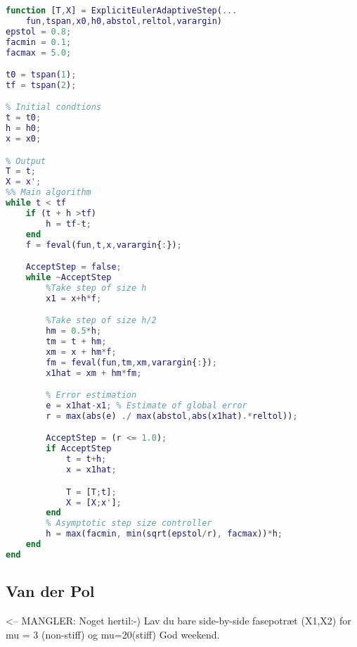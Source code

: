 \begin{adjustwidth*}{0cm}{-0.4cm}
\begin{lstlisting}[language=Matlab,caption=Explicit Euler (adaptive step size), label=ExplicitEulerFixie]
function [T,X] = ExplicitEulerAdaptiveStep(...
    fun,tspan,x0,h0,abstol,reltol,varargin)
epstol = 0.8;
facmin = 0.1;
facmax = 5.0;

t0 = tspan(1);
tf = tspan(2);

% Initial condtions
t = t0;
h = h0;
x = x0;

% Output
T = t;
X = x';
%% Main algorithm
while t < tf
    if (t + h >tf)
        h = tf-t;
    end
    f = feval(fun,t,x,varargin{:});

    AcceptStep = false;
    while ~AcceptStep
        %Take step of size h
        x1 = x+h*f;

        %Take step of size h/2
        hm = 0.5*h;
        tm = t + hm;
        xm = x + hm*f;
        fm = feval(fun,tm,xm,varargin{:});
        x1hat = xm + hm*fm;

        % Error estimation
        e = x1hat-x1; % Estimate of global error
        r = max(abs(e) ./ max(abstol,abs(x1hat).*reltol));

        AcceptStep = (r <= 1.0);
        if AcceptStep
            t = t+h;
            x = x1hat;

            T = [T;t];
            X = [X;x'];
        end
        % Asymptotic step size controller
        h = max(facmin, min(sqrt(epstol/r), facmax))*h;
    end
end
\end{lstlisting}
\end{adjustwidth*}

\subsection{Van der Pol}
<-- MANGLER: Noget hertil:-)
Lav du bare side-by-side fasepotræt (X1,X2) for mu = 3 (non-stiff) og mu=20(stiff)
God weekend.